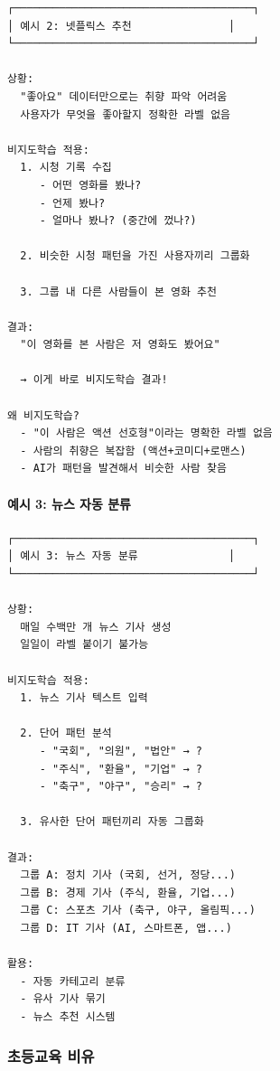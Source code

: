 \documentclass[a4paper, 11pt]{article}
\begin{document}
\begin{verbatim}
┌─────────────────────────────────────┐
│ 예시 2: 넷플릭스 추천               │
└─────────────────────────────────────┘

상황:
  "좋아요" 데이터만으로는 취향 파악 어려움
  사용자가 무엇을 좋아할지 정확한 라벨 없음

비지도학습 적용:
  1. 시청 기록 수집
     - 어떤 영화를 봤나?
     - 언제 봤나?
     - 얼마나 봤나? (중간에 껐나?)
  
  2. 비슷한 시청 패턴을 가진 사용자끼리 그룹화
  
  3. 그룹 내 다른 사람들이 본 영화 추천

결과:
  "이 영화를 본 사람은 저 영화도 봤어요"
  
  → 이게 바로 비지도학습 결과!

왜 비지도학습?
  - "이 사람은 액션 선호형"이라는 명확한 라벨 없음
  - 사람의 취향은 복잡함 (액션+코미디+로맨스)
  - AI가 패턴을 발견해서 비슷한 사람 찾음
\end{verbatim}

\hypertarget{uxc608uxc2dc-3-uxb274uxc2a4-uxc790uxb3d9-uxbd84uxb958}{%
\paragraph{예시 3: 뉴스 자동
분류}\label{uxc608uxc2dc-3-uxb274uxc2a4-uxc790uxb3d9-uxbd84uxb958}}

\begin{verbatim}
┌─────────────────────────────────────┐
│ 예시 3: 뉴스 자동 분류              │
└─────────────────────────────────────┘

상황:
  매일 수백만 개 뉴스 기사 생성
  일일이 라벨 붙이기 불가능

비지도학습 적용:
  1. 뉴스 기사 텍스트 입력
  
  2. 단어 패턴 분석
     - "국회", "의원", "법안" → ?
     - "주식", "환율", "기업" → ?
     - "축구", "야구", "승리" → ?
  
  3. 유사한 단어 패턴끼리 자동 그룹화

결과:
  그룹 A: 정치 기사 (국회, 선거, 정당...)
  그룹 B: 경제 기사 (주식, 환율, 기업...)
  그룹 C: 스포츠 기사 (축구, 야구, 올림픽...)
  그룹 D: IT 기사 (AI, 스마트폰, 앱...)

활용:
  - 자동 카테고리 분류
  - 유사 기사 묶기
  - 뉴스 추천 시스템
\end{verbatim}

\hypertarget{uxcd08uxb4f1uxad50uxc721-uxbe44uxc720}{%
\subsubsection{초등교육
비유}\label{uxcd08uxb4f1uxad50uxc721-uxbe44uxc720}}
\end{document}
